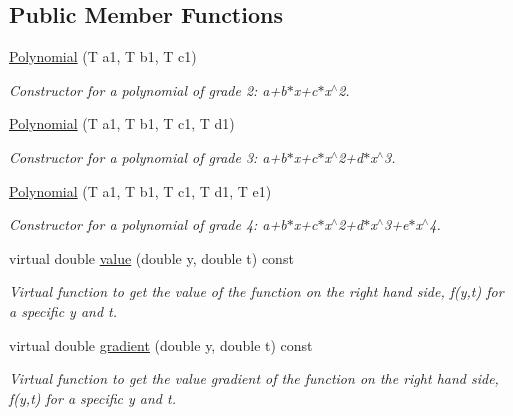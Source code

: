 \subsection*{Public Member Functions}
\begin{DoxyCompactItemize}
\item 
\hypertarget{class_polynomial_a6b42d7b39422dac0a92b26a090bda215}{}\hyperlink{class_polynomial_a6b42d7b39422dac0a92b26a090bda215}{Polynomial} (T a1, T b1, T c1)\label{class_polynomial_a6b42d7b39422dac0a92b26a090bda215}

\begin{DoxyCompactList}\small\item\em Constructor for a polynomial of grade 2\+: a+b$\ast$x+c$\ast$x$^\wedge$2. \end{DoxyCompactList}\item 
\hypertarget{class_polynomial_a6d62fec5c43fe16ae174c43ae4c7b9ed}{}\hyperlink{class_polynomial_a6d62fec5c43fe16ae174c43ae4c7b9ed}{Polynomial} (T a1, T b1, T c1, T d1)\label{class_polynomial_a6d62fec5c43fe16ae174c43ae4c7b9ed}

\begin{DoxyCompactList}\small\item\em Constructor for a polynomial of grade 3\+: a+b$\ast$x+c$\ast$x$^\wedge$2+d$\ast$x$^\wedge$3. \end{DoxyCompactList}\item 
\hypertarget{class_polynomial_a3f959f3ca97a53a2d8a07e2db5153cc9}{}\hyperlink{class_polynomial_a3f959f3ca97a53a2d8a07e2db5153cc9}{Polynomial} (T a1, T b1, T c1, T d1, T e1)\label{class_polynomial_a3f959f3ca97a53a2d8a07e2db5153cc9}

\begin{DoxyCompactList}\small\item\em Constructor for a polynomial of grade 4\+: a+b$\ast$x+c$\ast$x$^\wedge$2+d$\ast$x$^\wedge$3+e$\ast$x$^\wedge$4. \end{DoxyCompactList}\item 
\hypertarget{class_polynomial_a31e8324c085875a18a39cdf67468fe69}{}virtual double \hyperlink{class_polynomial_a31e8324c085875a18a39cdf67468fe69}{value} (double y, double t) const \label{class_polynomial_a31e8324c085875a18a39cdf67468fe69}

\begin{DoxyCompactList}\small\item\em Virtual function to get the value of the function on the right hand side, f(y,t) for a specific y and t. \end{DoxyCompactList}\item 
\hypertarget{class_polynomial_a55c6a16f0e4ba0be54c8368cbffba28f}{}virtual double \hyperlink{class_polynomial_a55c6a16f0e4ba0be54c8368cbffba28f}{gradient} (double y, double t) const \label{class_polynomial_a55c6a16f0e4ba0be54c8368cbffba28f}

\begin{DoxyCompactList}\small\item\em Virtual function to get the value gradient of the function on the right hand side, f\textquotesingle{}(y,t) for a specific y and t. \end{DoxyCompactList}\end{DoxyCompactItemize}


